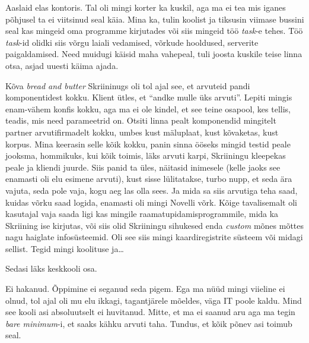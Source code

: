 Aaslaid elas kontoris. Tal oli mingi korter ka kuskil, aga ma ei tea mis iganes 
põhjusel ta ei viitsinud seal käia. Mina ka, tulin koolist ja tiksusin viimase 
bussini seal kas  mingeid oma programme kirjutades või siis mingeid töö 
\emph{task}-e tehes. Töö \emph{task}-id olidki siis võrgu laiali vedamised,  
võrkude hooldused, serverite paigaldamised. Need muidugi käisid maha vahepeal, 
tuli joosta kuskile teise linna otsa, asjad uuesti käima ajada. 

Kõva \emph{bread and butter} Skriininugs oli tol ajal see, et arvuteid pandi  
komponentidest kokku. Klient ütles, et \enquote{andke mulle üks arvuti}. Lepiti 
mingis enam-vähem konfis kokku, aga ma ei ole kindel, et see teine osapool, kes 
tellis, teadis, mis need parameetrid on. Otsiti linna pealt komponendid 
mingitelt partner arvutifirmadelt kokku, umbes kust mäluplaat, kust kõvaketas, 
kust korpus. Mina keerasin selle kõik kokku, panin sinna ööseks mingid 
testid peale jooksma, hommikuks, kui kõik toimis, läks arvuti karpi, Skriiningu 
kleepekas peale ja  kliendi juurde. Siis panid ta üles, näitasid inimesele (kelle 
jaoks see enamasti oli elu esimene arvuti), kust sisse 
lülitatakse,  turbo nupp, et seda ära vajuta, seda 
pole vaja, kogu aeg las olla sees. Ja mida sa siis arvutiga teha saad, kuidas 
võrku saad logida, enamasti oli mingi Novelli võrk. Kõige tavalisemalt  oli 
kasutajal vaja saada ligi kas mingile raamatupidamisprogrammile, mida ka 
Skriining ise kirjutas, või siis olid Skriiningu sihukesed enda \emph{custom} 
mõnes mõttes nagu haiglate infosüsteemid. Oli see siis mingi kaardiregistrite 
süsteem või midagi sellist. Tegid mingi koolituse ja\ldots 

Sedasi läks keskkooli osa. 


Ei hakanud. Õppimine ei seganud seda pigem. Ega ma nüüd mingi viieline ei 
olnud, tol ajal oli mu elu ikkagi, tagantjärele mõeldes, väga IT poole kaldu. 
Mind see kooli asi  absoluutselt ei huvitanud. Mitte, et ma ei saanud 
aru aga ma tegin \emph{bare minimum}-i, et saaks kähku arvuti taha. Tundus, et 
kõik põnev asi toimub seal. 

